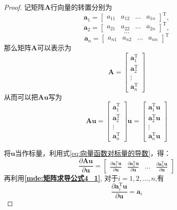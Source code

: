 \documentclass[withoutpreface,bwprint]{NoteBook}
\begin{document}
\begin{proof}
记矩阵$\mathbf{A}$行向量的转置分别为
$$
\mathbf{a}_1=
\begin{bmatrix}
    a_{11} & a_{12} & \dots & a_{1n}
\end{bmatrix}^\mathrm{T}, 
$$
$$
\mathbf{a}_2=
\begin{bmatrix}
    a_{21} & a_{22} & \dots & a_{2n}
\end{bmatrix}^\mathrm{T},
$$
$$
\dots
$$
$$
\mathbf{a}_n=
\begin{bmatrix}
    a_{n1} & a_{n2} & \dots & a_{nn}
\end{bmatrix}^\mathrm{T}
$$
那么矩阵$\mathbf{A}$可以表示为
$$
\mathbf{A}=
\begin{bmatrix}
    \mathbf{a}_1^\mathrm{T} \\
    \mathbf{a}_2^\mathrm{T} \\
    \vdots \\
    \mathbf{a}_n^\mathrm{T}
\end{bmatrix}
$$
从而可以把$\mathbf{A}\mathbf{u}$写为
\begin{equation}
    \label{eq:矩阵求导公式4_2证明式1}
    \mathbf{A}\mathbf{u}=
    \begin{bmatrix}
        \mathbf{a}_1^\mathrm{T} \\
        \mathbf{a}_2^\mathrm{T} \\
        \vdots \\
        \mathbf{a}_n^\mathrm{T}
    \end{bmatrix}
    \mathbf{u}
    =
    \begin{bmatrix}
        \mathbf{a}_1^\mathrm{T} \mathbf{u} \\
        \mathbf{a}_2^\mathrm{T} \mathbf{u} \\
        \vdots \\
        \mathbf{a}_n^\mathrm{T} \mathbf{u}
    \end{bmatrix}
\end{equation}

将$\mathbf{u}$当作标量，利用式\cref{eq:向量函数对标量的导数}，得：
\begin{equation}
    \label{eq:矩阵求导公式4_2证明式2}
    \frac{\partial \mathbf{A}\mathbf{u}}{\partial \mathbf{u}} 
    =
    \begin{bmatrix} 
    \frac{\partial \mathbf{a}_1^\mathrm{T} \mathbf{u}}{\partial \mathbf{u}} & \frac{\partial \mathbf{a}_2^\mathrm{T} \mathbf{u}}{\partial \mathbf{u}} & \dots & \frac{\partial \mathbf{a}_n^\mathrm{T} \mathbf{u}}{\partial \mathbf{u}}
    \end{bmatrix} 
\end{equation}
再利用\textbf{\cref{mde:矩阵求导公式4_1}},
对于$i=1,2,\dots,n$,有
\begin{equation}
    \label{eq:矩阵求导公式4_2证明式3}
    \frac{\partial \mathbf{a}_i^\mathrm{T} \mathbf{u}}{\partial \mathbf{u}} 
    =
    \mathbf{a}_i
\end{equation}


\end{proof}
\end{document}
